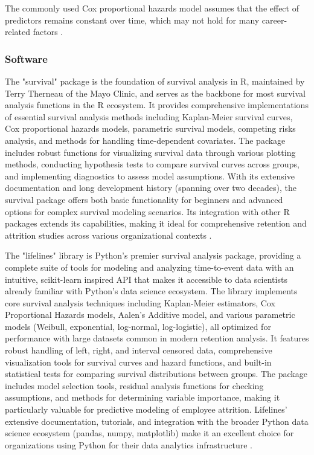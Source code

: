 \documentclass[../main.tex]{subfiles}
\begin{document}
The commonly used Cox proportional hazards model assumes that the effect of predictors remains constant over time, which may not hold for many career-related factors \citep{limitations2016survival}.

\subsubsection{Software}

The "survival" package is the foundation of survival analysis in R, maintained by Terry Therneau of the Mayo Clinic, and serves as the backbone for most survival analysis functions in the R ecosystem. It provides comprehensive implementations of essential survival analysis methods including Kaplan-Meier survival curves, Cox proportional hazards models, parametric survival models, competing risks analysis, and methods for handling time-dependent covariates. The package includes robust functions for visualizing survival data through various plotting methods, conducting hypothesis tests to compare survival curves across groups, and implementing diagnostics to assess model assumptions. With its extensive documentation and long development history (spanning over two decades), the survival package offers both basic functionality for beginners and advanced options for complex survival modeling scenarios. Its integration with other R packages extends its capabilities, making it ideal for comprehensive retention and attrition studies across various organizational contexts \citep{therneau2023survival}.

The "lifelines" library is Python's premier survival analysis package, providing a complete suite of tools for modeling and analyzing time-to-event data with an intuitive, scikit-learn inspired API that makes it accessible to data scientists already familiar with Python's data science ecosystem. The library implements core survival analysis techniques including Kaplan-Meier estimators, Cox Proportional Hazards models, Aalen's Additive model, and various parametric models (Weibull, exponential, log-normal, log-logistic), all optimized for performance with large datasets common in modern retention analysis. It features robust handling of left, right, and interval censored data, comprehensive visualization tools for survival curves and hazard functions, and built-in statistical tests for comparing survival distributions between groups. The package includes model selection tools, residual analysis functions for checking assumptions, and methods for determining variable importance, making it particularly valuable for predictive modeling of employee attrition. Lifelines' extensive documentation, tutorials, and integration with the broader Python data science ecosystem (pandas, numpy, matplotlib) make it an excellent choice for organizations using Python for their data analytics infrastructure \citep{lifelines2023documentation}.
\end{document}
